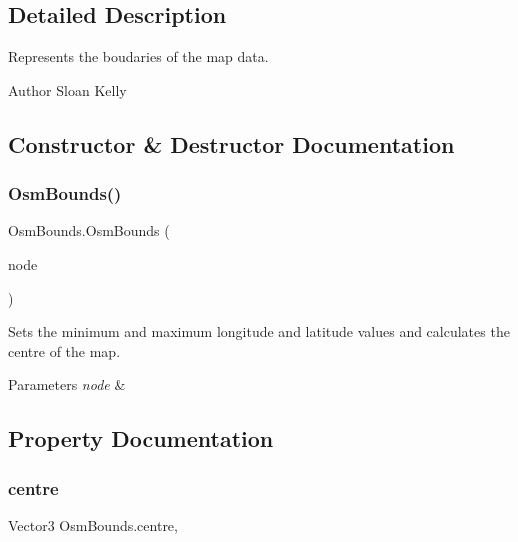 \subsection{Detailed Description}
Represents the boudaries of the map data. 

\begin{DoxyAuthor}{Author}
Sloan Kelly
\end{DoxyAuthor}


\subsection{Constructor \& Destructor Documentation}
\mbox{\label{class_osm_bounds_a5440393c02b739012154b1473c2ffc4a}} 
\subsubsection{\texorpdfstring{OsmBounds()}{OsmBounds()}}
{\footnotesize\ttfamily Osm\+Bounds.\+Osm\+Bounds (\begin{DoxyParamCaption}\item[{Xml\+Node}]{node }\end{DoxyParamCaption})}



Sets the minimum and maximum longitude and latitude values and calculates the centre of the map. 


\begin{DoxyParams}{Parameters}
{\em node} & \\
\hline
\end{DoxyParams}


\subsection{Property Documentation}
\mbox{\label{class_osm_bounds_a8883072b945265148eba70b446ad37fd}} 
\subsubsection{\texorpdfstring{centre}{centre}}
{\footnotesize\ttfamily Vector3 Osm\+Bounds.\+centre\hspace{0.3cm}{\ttfamily [get]}, {}}



